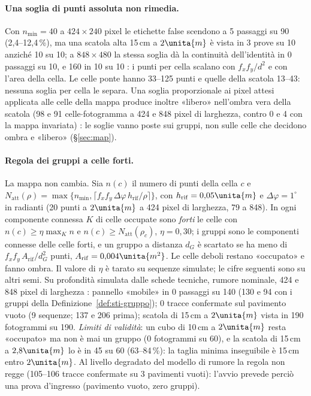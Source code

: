 \paragraph{Una soglia di punti assoluta non rimedia.} Con $n_{\min}=40$ a $424\times240$ pixel le etichette false scendono a 5 passaggi su 90 (2,4--12,4\,\%), ma una scatola alta 15\,cm a $2\unita{m}$ è vista in 3 prove su 10 anziché 10 su 10; a $848\times480$ la stessa soglia dà la continuità dell'identità in 0 passaggi su 10, e 160 in 10 su 10 : i punti per cella scalano con $f_xf_y/d^2$ e con l'area della cella. Le celle ponte hanno 33--125 punti e quelle della scatola 13--43: nessuna soglia per cella le separa. Una soglia proporzionale ai pixel attesi applicata alle celle della mappa produce inoltre «libero» nell'ombra vera della scatola (98 e 91 celle$\cdot$fotogramma a 424 e 848 pixel di larghezza, contro 0 e 4 con la mappa invariata) : le soglie vanno poste sui gruppi, non sulle celle che decidono ombra e «libero» (\S\ref{sec:map}).

\paragraph{Regola dei gruppi a celle forti.} La mappa non cambia. Sia $n(c)$ il numero di punti della cella $c$ e $N_{\mathrm{att}}(\rho)=\max\{n_{\min},\lceil f_xf_y\,\Delta\varphi\,h_{\mathrm{rif}}/\rho\rceil\}$, con $h_{\mathrm{rif}}=0{,}05\unita{m}$ e $\Delta\varphi=1^\circ$ in radianti (20 punti a $2\unita{m}$ a 424 pixel di larghezza, 79 a 848). In ogni componente connessa $K$ di celle occupate sono \emph{forti} le celle con $n(c)\ge\eta\max_K n$ e $n(c)\ge N_{\mathrm{att}}(\rho_c)$, $\eta=0{,}30$; i gruppi sono le componenti connesse delle celle forti, e un gruppo a distanza $d_G$ è scartato se ha meno di $f_xf_y\,A_{\mathrm{rif}}/d_G^2$ punti, $A_{\mathrm{rif}}=0{,}004\unita{m^2}$. Le celle deboli restano «occupato» e fanno ombra. Il valore di $\eta$ è tarato su sequenze simulate; le cifre seguenti sono su altri semi. Su profondità simulata dalle schede tecniche, rumore nominale, 424 e 848 pixel di larghezza : pannello «mobile» in 0 passaggi su 140 (130 e 94 con i gruppi della Definizione~\ref{def:sti-gruppo}); 0 tracce confermate sul pavimento vuoto (9 sequenze; 137 e 206 prima); scatola di 15\,cm a $2\unita{m}$ vista in 190 fotogrammi su 190. \emph{Limiti di validità}: un cubo di 10\,cm a $2\unita{m}$ resta «occupato» ma non è mai un gruppo (0 fotogrammi su 60), e la scatola di 15\,cm a $2{,}8\unita{m}$ lo è in 45 su 60 (63--84\,\%): la taglia minima inseguibile è 15\,cm entro $2\unita{m}$. Al livello degradato del modello di rumore la regola non regge (105--106 tracce confermate su 3 pavimenti vuoti): l'avvio prevede perciò una prova d'ingresso (pavimento vuoto, zero gruppi).

